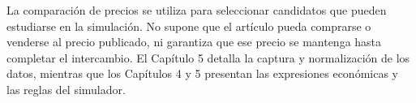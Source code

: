La comparación de precios se utiliza para seleccionar candidatos que pueden estudiarse en la simulación. No supone que el artículo pueda comprarse o venderse al precio publicado, ni garantiza que ese precio se mantenga hasta completar el intercambio. El Capítulo 5 detalla la captura y normalización de los datos, mientras que los Capítulos 4 y 5 presentan las expresiones económicas y las reglas del simulador.
